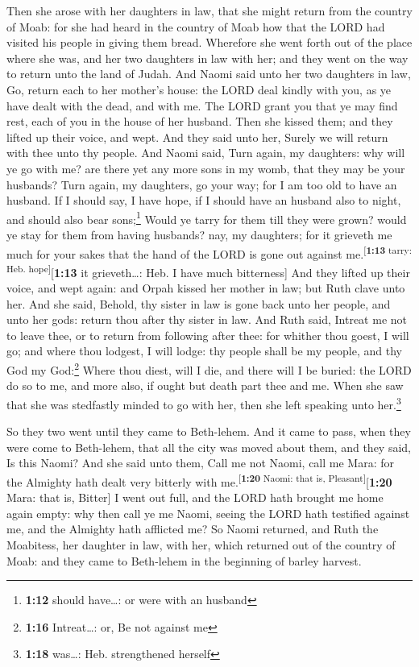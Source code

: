  Then she arose with her daughters in law, that she might
return from the country of Moab: for she had heard in the country of
Moab how that the LORD had visited his people in giving them bread.
 Wherefore she went forth out of the place where she was,
and her two daughters in law with her; and they went on the way to
return unto the land of Judah.  And Naomi said unto her
two daughters in law, Go, return each to her mother's house: the LORD
deal kindly with you, as ye have dealt with the dead, and with me.
 The LORD grant you that ye may find rest, each of you in
the house of her husband. Then she kissed them; and they lifted up their
voice, and wept.  And they said unto her, Surely we will
return with thee unto thy people.  And Naomi said, Turn
again, my daughters: why will ye go with me? are there yet any more sons
in my womb, that they may be your husbands?  Turn again,
my daughters, go your way; for I am too old to have an husband. If I
should say, I have hope, if I should have an husband also to night, and
should also bear sons;\footnote{\textbf{1:12} should have\ldots: or were
  with an husband}  Would ye tarry for them till they
were grown? would ye stay for them from having husbands? nay, my
daughters; for it grieveth me much for your sakes that the hand of the
LORD is gone out against me.\textsuperscript{{[}\textbf{1:13} tarry:
Heb. hope{]}}{[}\textbf{1:13} it grieveth\ldots: Heb. I have much
bitterness{]}  And they lifted up their voice, and wept
again: and Orpah kissed her mother in law; but Ruth clave unto her.
 And she said, Behold, thy sister in law is gone back
unto her people, and unto her gods: return thou after thy sister in law.
 And Ruth said, Intreat me not to leave thee, or to
return from following after thee: for whither thou goest, I will go; and
where thou lodgest, I will lodge: thy people shall be my people, and thy
God my God:\footnote{\textbf{1:16} Intreat\ldots: or, Be not against me}
 Where thou diest, will I die, and there will I be
buried: the LORD do so to me, and more also, if ought but death part
thee and me.  When she saw that she was stedfastly minded
to go with her, then she left speaking unto her.\footnote{\textbf{1:18}
  was\ldots: Heb. strengthened herself}

 So they two went until they came to Beth-lehem. And it
came to pass, when they were come to Beth-lehem, that all the city was
moved about them, and they said, Is this Naomi?  And she
said unto them, Call me not Naomi, call me Mara: for the Almighty hath
dealt very bitterly with me.\textsuperscript{{[}\textbf{1:20} Naomi:
that is, Pleasant{]}}{[}\textbf{1:20} Mara: that is, Bitter{]}
 I went out full, and the LORD hath brought me home again
empty: why then call ye me Naomi, seeing the LORD hath testified against
me, and the Almighty hath afflicted me?  So Naomi
returned, and Ruth the Moabitess, her daughter in law, with her, which
returned out of the country of Moab: and they came to Beth-lehem in the
beginning of barley harvest.


